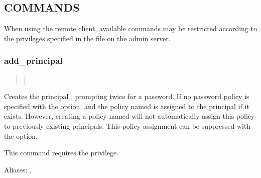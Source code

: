 \documentclass[letterpaper,10pt,english]{sphinxmanual}
\begin{document}
\subsection{COMMANDS}
\label{\detokenize{admin/admin_commands/kadmin_local:commands}}
When using the remote client, available commands may be restricted
according to the privileges specified in the {\hyperref[\detokenize{admin/conf_files/kadm5_acl:kadm5-acl-5}]{}} file
on the admin server.


\subsubsection{add\_principal}
\label{\detokenize{admin/admin_commands/kadmin_local:add-principal}}\label{\detokenize{admin/admin_commands/kadmin_local:id1}}\begin{quote}

 {[}\sphinxstyleemphasis{options}{]} 
\end{quote}

Creates the principal , prompting twice for a password.  If
no password policy is specified with the  option, and the
policy named  is assigned to the principal if it exists.
However, creating a policy named  will not automatically
assign this policy to previously existing principals.  This policy
assignment can be suppressed with the  option.

This command requires the  privilege.

Aliases: , 
\end{document}
